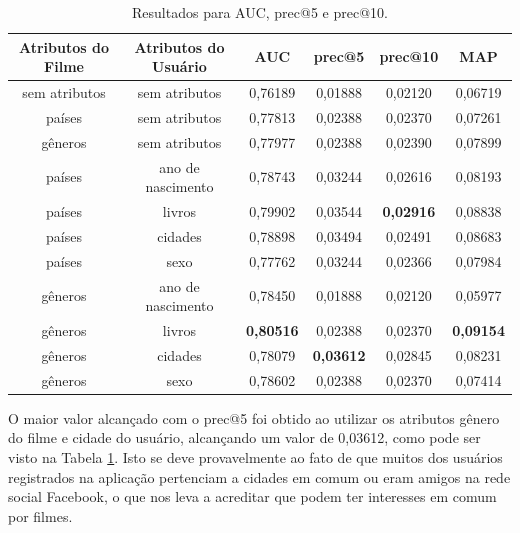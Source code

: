 \begin{table}[]
	\centering
	\caption{Resultados para AUC, prec@5 e prec@10.}
	\label{tab:resultados}
	\begin{tabular}{|c|c|c|c|c|c|}
		\hline
		\textbf{Atributos do Filme} 	& \textbf{Atributos do Usuário} & \textbf{AUC} 		& \textbf{prec@5} 	& \textbf{prec@10} 	& \textbf{MAP} 		\\ \hline
		sem atributos                   & sem atributos            		& 0,76189      		& 0,01888         	& 0,02120  			& 0,06719          	\\ \hline
		países                			& sem atributos            		& 0,77813      		& 0,02388         	& 0,02370  			& 0,07261          	\\ \hline
		gêneros               			& sem atributos            		& 0,77977      		& 0,02388         	& 0,02390  			& 0,07899         	\\ \hline
		países                			& ano de nascimento          	& 0,78743      		& 0,03244         	& 0,02616  			& 0,08193        	\\ \hline
		países                			& livros              			& 0,79902      		& 0,03544         	& \textbf{0,02916} 	& 0,08838         	\\ \hline
		países                			& cidades             			& 0,78898      		& 0,03494         	& 0,02491  			& 0,08683        	\\ \hline
		países                			& sexo            				& 0,77762      		& 0,03244         	& 0,02366  			& 0,07984         	\\ \hline
		gêneros                   		& ano de nascimento          	& 0,78450      		& 0,01888         	& 0,02120  			& 0,05977         	\\ \hline
		gêneros                   		& livros              			& \textbf{0,80516}	& 0,02388         	& 0,02370   		& \textbf{0,09154}  \\ \hline
		gêneros                   		& cidades             			& 0,78079      		& \textbf{0,03612} 	& 0,02845  			& 0,08231      		\\ \hline
		gêneros                   		& sexo            				& 0,78602      		& 0,02388         	& 0,02370  			& 0,07414         	\\ \hline
	\end{tabular}
\end{table}

O maior valor alcançado com o prec@5 foi obtido ao utilizar os atributos gênero do filme e cidade do usuário, alcançando um valor de 0,03612, como pode ser visto na Tabela \ref{tab:resultados}. Isto se deve provavelmente ao fato de que muitos dos usuários registrados na aplicação pertenciam a cidades em comum ou eram amigos na rede social Facebook, o que nos leva a acreditar que podem ter interesses em comum por filmes.


